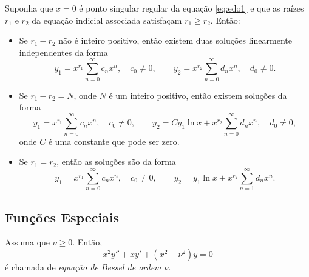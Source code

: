 \documentclass{article}
\begin{document}
\begin{rem}
    Suponha que \(x=0\) é ponto singular regular da equação \eqref{eq:edo1} e que as raízes \(r_1\) e \(r_2\) da equação indicial associada satisfaçam \(r_1 \geq r_2\). Então:
    \begin{itemize}
        \item [\textbf{Caso I.}] Se \(r_1 - r_2\) não é inteiro positivo, então existem duas soluções linearmente independentes da forma
        \begin{equation}
            y_1 = x^{r_1} \sum_{n=0}^{\infty} c_n x^n, \quad c_0 \neq 0, \qquad y_2 = x^{r_2} \sum_{n=0}^{\infty} d_n x^n, \quad d_0 \neq 0.
        \end{equation}
        \item [\textbf{Caso II.}] Se \(r_1 - r_2 = N\), onde \(N\) é um inteiro positivo, então existem soluções da forma
        \begin{equation}
            y_1 = x^{r_1} \sum_{n=0}^{\infty} c_n x^n, \quad c_0 \neq 0, \qquad y_2 = C y_1 \ln x + x^{r_2} \sum_{n=0}^{\infty} d_n x^n, \quad d_0 \neq 0,
        \end{equation}
        \noindent onde \(C\) é uma constante que pode ser zero.
        \item [\textbf{Caso III.}] Se \(r_1 = r_2\), então as soluções são da forma
        \begin{equation}
            y_1 = x^{r_1} \sum_{n=0}^{\infty} c_n x^n, \quad c_0 \neq 0, \qquad y_2 = y_1 \ln x + x^{r_2} \sum_{n=1}^{\infty} d_n x^n.
        \end{equation}
    \end{itemize}
\end{rem}

\subsection{Funções Especiais}

\begin{defn}
    Assuma que \(\nu\geq0\). Então,
    \begin{equation}\label{eq:bessel}
        x^2y'' + xy' + (x^2 - \nu^2)y = 0
    \end{equation}
    \noindent é chamada de \emph{equação de Bessel de ordem \(\nu\)}.
\end{defn}
\end{document}
